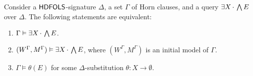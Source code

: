 \documentclass[a4paper,UKenglish,cleveref,autoref]{lipics-v2019}
\begin{document}
\begin{theorem} 
  \label{theorem:Herbrand}
  Consider a ${\mathsf{HDFOLS}}$-signature $\Delta$, a set\/ $\Gamma$ of Horn clauses, and a query $\exists X\,{\cdot}\, \bigwedge E$ over $\Delta$.
  The following statements are equivalent:
  \begin{enumerate}
  \item \label{LP1} $\Gamma \vDash \exists X\,{\cdot}\, \bigwedge E$.

  \item \label{LP2} $(W^{\Gamma}, M^{\Gamma}) \vDash \exists X\,{\cdot}\, \bigwedge E$, where $(W^{\Gamma}, M^{\Gamma})$ is an initial model of\/ $\Gamma$.

  \item \label{LP3} $\Gamma \models \theta(E)$ for some $\Delta$-substitution $\theta \colon X \to \emptyset$.
  \end{enumerate}
\end{theorem}
\end{document}
